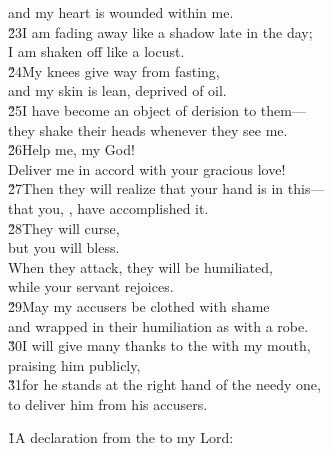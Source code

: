 \begin{poetry}
\poemll    and my heart is wounded within me. \\
\poeml \v{23}I am fading away like a shadow late in the day; \\
\poemll    I am shaken off like a locust. \\
\poeml \v{24}My knees give way from fasting, \\
\poemll    and my skin is lean, deprived of oil. \\
\poeml \v{25}I have become an object of derision to them--- \\
\poemll    they shake their heads whenever they see me. \\
\poeml \v{26}Help me,  my God! \\
\poemll    Deliver me in accord with your gracious love! \\
\poeml \v{27}Then they will realize that your hand is in this--- \\
\poemll    that you, , have accomplished it. \\
\poeml \v{28}They will curse, \\
\poemll    but you will bless. \\
\poeml When they attack, they will be humiliated, \\
\poemll    while your servant rejoices. \\
\poeml \v{29}May my accusers be clothed with shame \\
\poemll    and wrapped in their humiliation as with a robe. \\
\poeml \v{30}I will give many thanks to the  with my mouth, \\
\poemll    praising him publicly, \\
\poeml \v{31}for he stands at the right hand of the needy one, \\
\poemll    to deliver him from his accusers.
\end{poetry}

\begin{poetry}
\poeml \v{1}A declaration from the  to my Lord:
\end{poetry}

